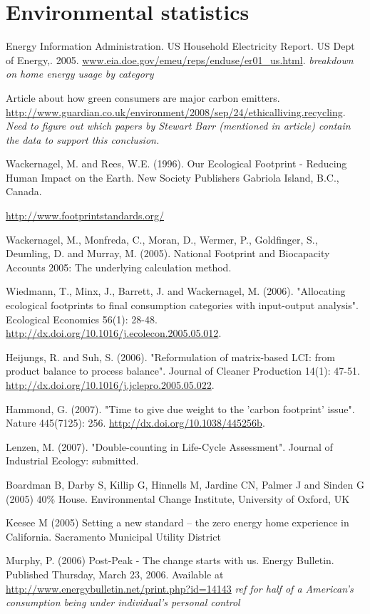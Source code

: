 \section{Environmental statistics}
Energy Information Administration. US Household Electricity Report. US Dept of Energy,. 2005. \url{www.eia.doe.gov/emeu/reps/enduse/er01_us.html}. \emph{breakdown on home energy usage by category}

Article about how green consumers are major carbon emitters. \url{http://www.guardian.co.uk/environment/2008/sep/24/ethicalliving.recycling}. \emph{Need to figure out which papers by Stewart Barr (mentioned in article) contain the data to support this conclusion.}

Wackernagel, M. and Rees, W.E. (1996). Our Ecological Footprint - Reducing Human Impact on the Earth. New Society Publishers Gabriola Island, B.C., Canada.

\url{http://www.footprintstandards.org/}

Wackernagel, M., Monfreda, C., Moran, D., Wermer, P., Goldfinger, S., Deumling, D. and Murray, M. (2005). National Footprint and Biocapacity Accounts 2005: The underlying calculation method.

Wiedmann, T., Minx, J., Barrett, J. and Wackernagel, M. (2006). "Allocating ecological footprints to final consumption categories with input-output analysis". Ecological Economics 56(1): 28-48. \url{http://dx.doi.org/10.1016/j.ecolecon.2005.05.012}.

Heijungs, R. and Suh, S. (2006). "Reformulation of matrix-based LCI: from product balance to process balance". Journal of Cleaner Production 14(1): 47-51. 
\url{http://dx.doi.org/10.1016/j.jclepro.2005.05.022}.

Hammond, G. (2007). "Time to give due weight to the 'carbon footprint' issue". Nature 445(7125): 256. \url{http://dx.doi.org/10.1038/445256b}.

Lenzen, M. (2007). "Double-counting in Life-Cycle Assessment". Journal of Industrial Ecology: submitted.

Boardman B, Darby S, Killip G, Hinnells M, Jardine CN, Palmer J and Sinden G (2005) 40\% House. Environmental Change Institute, University of Oxford, UK

Keesee M (2005) Setting a new standard – the zero energy home experience in California. Sacramento Municipal Utility District

Murphy, P. (2006) Post-Peak - The change starts with us. Energy Bulletin. Published Thursday, March 23, 2006. Available at \url{http://www.energybulletin.net/print.php?id=14143} \emph{ref for half of a American's consumption being under individual's personal control}

